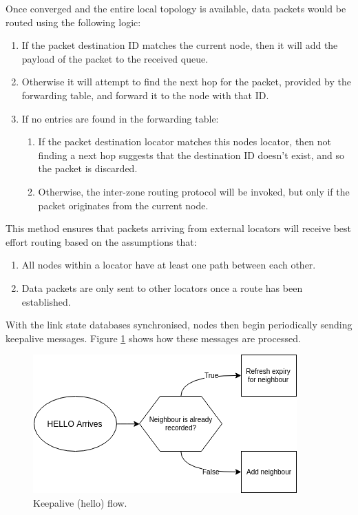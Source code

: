 \documentclass[12pt]{article}
\begin{document}
Once converged and the entire local topology is available, data packets would be routed using the following logic:

\begin{enumerate}
	\item If the packet destination ID matches the current node, then it will add the payload of the packet to the received queue. 
	\item Otherwise it will attempt to find the next hop for the packet, provided by the forwarding table, and forward it to the node with that ID. 
	\item If no entries are found in the forwarding table:
	\begin{enumerate}
		\item If the packet destination locator matches this nodes locator, then not finding a next hop suggests that the destination ID doesn't exist, and so the packet is discarded. 
		\item Otherwise, the inter-zone routing protocol will be invoked, but only if the packet originates from the current node. 
	\end{enumerate}
\end{enumerate}

This method ensures that packets arriving from external locators will receive best effort routing based on the assumptions that:

\begin{enumerate}
	\item All nodes within a locator have at least one path between each other. 
	\item Data packets are only sent to other locators once a route has been established.
\end{enumerate}

With the link state databases synchronised, nodes then begin periodically sending keepalive messages. Figure \ref{fig:helloflow} shows how these messages are processed. 

\begin{figure}[!ht]
	\centering
	\includegraphics[width=0.6\linewidth]{images/helloflow}
	\caption{Keepalive (hello) flow.}
	\label{fig:helloflow}
\end{figure}
\end{document}
